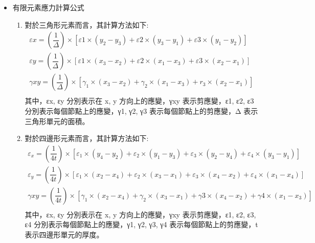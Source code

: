 \begin{itemize}

\item 有限元素應力計算公式


\begin{enumerate}
\item 對於三角形元素而言，其計算方法如下:\\
\[
\begin{aligned}
\varepsilon x=\left( \dfrac{1}{\Delta }\right) \times \left[ \varepsilon 1\times \left( y_{2}-y_{3}\right) +\varepsilon 2\times \left( y_{3}-y_{1}\right) +\varepsilon 3\times \left( y_{1}-y_{2}\right) \right]\\
\varepsilon y=\left( \dfrac{1}{\Delta }\right) \times \left[ \varepsilon 1\times \left( x_{3}-x_{2}\right) +\varepsilon 2\times \left( x_{1}-x_{3}\right) +\varepsilon 3\times \left( x_{2}-x_{1}\right) \right]\\
\gamma xy=\left( \dfrac{1}{\Delta }\right) \times \left[ \gamma _{1}\times \left( x_{3}-x_{2}\right) +\gamma _{2}\times \left( x_{1}-x_{3}\right) +r_{3}\times \left( x_{2}-x_{1}\right) \right]\\
\end{aligned}
\]
其中，εx, εy 分別表示在 x, y 方向上的應變，γxy 表示剪應變，ε1, ε2, ε3 分別表示每個節點上的應變，γ1, γ2, γ3 表示每個節點上的剪應變，Δ 表示三角形單元的面積。\\

\item 對於四邊形元素而言，其計算方法如下:\\
\[
\begin{aligned}
\varepsilon _{x}=\left( \dfrac{1}{4t}\right) \times \left[ \varepsilon _{1}\times \left( y_{4}-y_{2}\right) +\varepsilon _{2}\times \left( y_{1}-y_{3}\right) +\varepsilon _{3}\times \left( y_{2}-y_{4}\right) +\varepsilon _{4}\times \left( y_{3}-y_{1}\right) \right]\\
\varepsilon _{y}=\left( \dfrac{1}{4t}\right) \times \left[ \varepsilon _{1}\times \left( x_{2}-x_{4}\right) +\varepsilon _{2}\times \left( x_{3}-x_{1}\right) +\varepsilon _{3}\times \left( x_{4}-x_{2}\right) +\varepsilon _{4}\times \left( x_{1}-x_{4}\right) \right]\\
\gamma xy=\left( \dfrac{1}{4t}\right) \times \left[ \gamma _{1}\times \left( x_{2}-x_{4}\right) +\gamma _{2}\times \left( x_{3}-x_{1}\right) +\gamma 3\times \left( x_{4}-x_{2}\right) +\gamma 4\times \left( x_{1}-x_{3}\right) \right]\\
\end{aligned}
\]
其中，εx, εy 分別表示在 x, y 方向上的應變，γxy 表示剪應變，ε1, ε2, ε3, ε4 分別表示每個節點上的應變，γ1, γ2, γ3, γ4 表示每個節點上的剪應變，t 表示四邊形單元的厚度。
\end{enumerate}
\newpage


\end{itemize}
